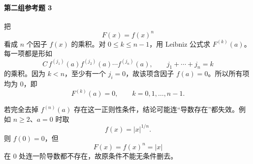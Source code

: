 \paragraph{第二组参考题 3}
\begin{xsolution}
把
\[
  F(x)=f(x)^n
\]
看成 $n$ 个因子 $f(x)$ 的乘积。对 $0\le k\le n-1$，用 Leibniz 公式求 $F^{(k)}(a)$。每一项都是形如
\[
  C\,f^{(j_1)}(a)f^{(j_2)}(a)\cdots f^{(j_n)}(a),
  \qquad j_1+\cdots+j_n=k
\]
的乘积。因为 $k<n$，至少有一个 $j_i=0$，故该项含因子 $f(a)=0$。所以所有项均为 0，即
\[
  \boxed{F^{(k)}(a)=0,\qquad k=0,1,\ldots,n-1.}
\]

若完全去掉 $f^{(n)}(a)$ 存在这一正则性条件，结论可能连“导数存在”都失效。例如 $n\ge2$、$a=0$ 时取
\[
  f(x)=|x|^{1/n}.
\]
则 $f(0)=0$，但
\[
  F(x)=f(x)^n=|x|
\]
在 $0$ 处连一阶导数都不存在，故原条件不能无条件删去。
\end{xsolution}

